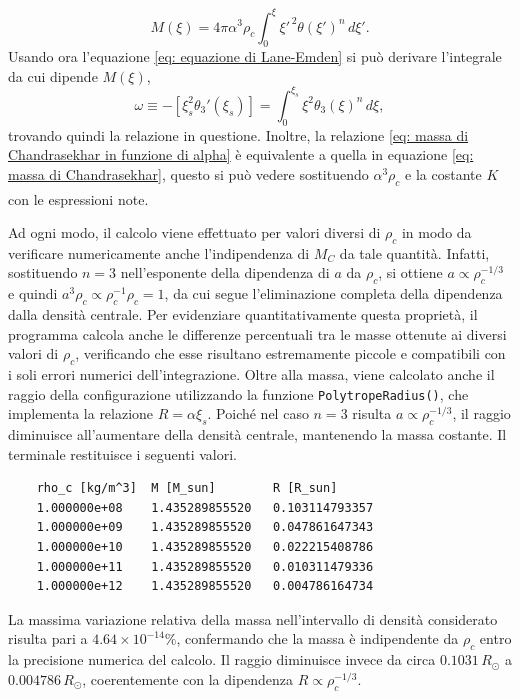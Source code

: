 \documentclass{article}
\newcommand{\supcite}[2][]{\textsuperscript{\cite[#1]{#2}}}
\numberwithin{equation}{section}
\begin{document}
\begin{equation}
    M(\xi) = 4\pi \alpha^3\rho_c\int_0^\xi \xi'^{\,2}\theta(\xi')^n\,d\xi'.
\end{equation}
Usando ora l'equazione \eqref{eq: equazione di Lane-Emden} si può derivare l'integrale da cui dipende $M(\xi)$, 
\begin{equation}
    \omega \equiv -[\xi_s^2\theta_3'(\xi_s)] = \int_0^{\xi_s}\xi^2\theta_3(\xi)^n\,d\xi,
\end{equation}
trovando quindi la relazione in questione. Inoltre, la relazione \eqref{eq: massa di Chandrasekhar in funzione di alpha} è equivalente a quella in equazione \eqref{eq: massa di Chandrasekhar}, questo si può vedere sostituendo $\alpha^3\rho_c$ e la costante $K$ con le espressioni note\supcite[pg.~3]{chavanis2007}.

Ad ogni modo, il calcolo viene effettuato per valori diversi di $\rho_c$ in modo da verificare numericamente anche l'indipendenza di $M_C$ da tale quantità. Infatti, sostituendo $n = 3$ nell'esponente della dipendenza di $a$ da $\rho_c$, si ottiene $a \propto \rho_c^{-1/3}$ e quindi $a^3\rho_c\propto\rho_c^{-1}\rho_c = 1$, da cui segue l'eliminazione completa della dipendenza dalla densità centrale. Per evidenziare quantitativamente questa proprietà, il programma calcola anche le differenze percentuali tra le masse ottenute ai diversi valori di $\rho_c$, verificando che esse risultano estremamente piccole e compatibili con i soli errori numerici dell'integrazione. Oltre alla massa, viene calcolato anche il raggio della configurazione utilizzando la funzione \texttt{PolytropeRadius()}, che implementa la relazione $R = \alpha\xi_s$. Poiché nel caso $n = 3$ risulta $a \propto \rho_c^{-1/3}$, il raggio diminuisce all'aumentare della densità centrale, mantenendo la massa costante. Il terminale restituisce i seguenti valori.
\begin{verbatim}
    rho_c [kg/m^3]  M [M_sun]        R [R_sun]
    1.000000e+08    1.435289855520   0.103114793357
    1.000000e+09    1.435289855520   0.047861647343
    1.000000e+10    1.435289855520   0.022215408786
    1.000000e+11    1.435289855520   0.010311479336
    1.000000e+12    1.435289855520   0.004786164734
\end{verbatim}
La massima variazione relativa della massa nell'intervallo di densità considerato risulta pari a $4.64\times10^{-14}\%$, confermando che la massa è indipendente da $\rho_c$ entro la precisione numerica del calcolo. Il raggio diminuisce invece da circa $0.1031\,R_\odot$ a $0.004786\,R_\odot$, coerentemente con la dipendenza $R \propto \rho_c^{-1/3}$.
\end{document}
